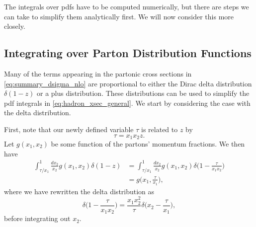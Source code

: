 The integrals over \glspl{pdf} have to be computed numerically, but there are steps we can take to simplify them analytically first. We will now consider this more closely.


\subsection{Integrating over Parton Distribution Functions}
Many of the terms appearing in the partonic cross sections in \cref{eq:summary_dsigma_nlo} are proportional to either the Dirac delta distribution $\delta(1-z)$ or a plus distribution.
These distributions can be used to simplify the \gls{pdf} integrals in \cref{eq:hadron_xsec_general}. We start by considering the case with the delta distribution.

First, note that our newly defined variable $\tau$ is related to $z$ by
\begin{equation}
    \tau = x_1 x_2 z.
\end{equation}
Let $g(x_1,x_2)$ be some function of the partons' momentum fractions. We then have
\begin{align}
    \int_{\tau/x_1}^1 \frac{dx_2}{x_2} g(x_1,x_2)\delta(1-z) &= \int_{\tau/x_1}^1 \frac{dx_2}{x_2} g(x_1,x_2) \delta\biggl(1-\frac{\tau}{x_1 x_2}\biggr)
    \nonumber \\
    &= g\biggl(x_1, \frac{\tau}{x_1}\biggr),
    \label{eq:int_x2_delta}
\end{align}
where we have rewritten the delta distribution as
\begin{equation}
    \delta\biggl(1-\frac{\tau}{x_1 x_2}\biggr) = \frac{x_1 x_2^2}{\tau} \delta\biggl(x_2 - \frac{\tau}{x_1}\biggr),
\end{equation}
before integrating out $x_2$.

